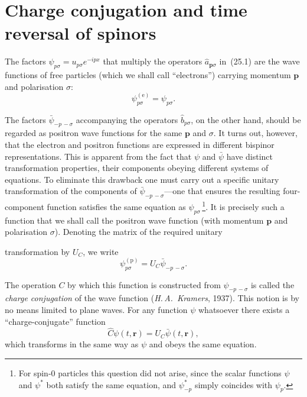 \section{Charge conjugation and time reversal of spinors}

The factors $\psi_{p\sigma} = u_{p\sigma}e^{-ipx}$ that multiply the operators $\widehat a_{\mathbf{p}\sigma}$ in~(25.1) are the wave functions of free particles (which we shall call ``electrons'') carrying momentum $\mathbf{p}$ and polarisation $\sigma$:
\[
\psi^{(\text{e})}_{p\sigma} = \psi_{p\sigma}.
\]

The factors $\bar\psi_{-p\,-\sigma}$ accompanying the operators $\widehat b_{p\sigma}$, on the other hand, should be regarded as positron wave functions for the same $\mathbf{p}$ and $\sigma$. It turns out, however, that the electron and positron functions are expressed in different bispinor representations. This is apparent from the fact that $\psi$ and $\bar\psi$ have distinct transformation properties, their components obeying different systems of equations. To eliminate this drawback one must carry out a specific unitary transformation of the components of $\bar\psi_{-p\,-\sigma}$---one that ensures the resulting four-component function satisfies the same equation as $\psi_{p\sigma}$\,\footnote{For spin-0 particles this question did not arise, since the scalar functions $\psi$ and $\psi^*$ both satisfy the same equation, and $\psi^*_{-p}$ simply coincides with $\psi_p$.}. It is precisely such a function that we shall call the positron wave function (with momentum $\mathbf{p}$ and polarisation $\sigma$). Denoting the matrix of the required unitary

transformation by $U_C$, we write
\begin{equation}
\psi^{(\text{p})}_{p\sigma} = U_C\bar\psi_{-p\,-\sigma}.
\tag{26.1}
\end{equation}

The operation $C$ by which this function is constructed from $\psi_{-p\,-\sigma}$ is called the \emph{charge conjugation} of the wave function (\emph{H.\,A.~Kramers}, 1937). This notion is by no means limited to plane waves. For any function $\psi$ whatsoever there exists a ``charge-conjugate'' function
\begin{equation}
\widehat C\psi(t,\mathbf{r}) = U_C\bar\psi(t,\mathbf{r}),
\tag{26.2}
\end{equation}
which transforms in the same way as $\psi$ and obeys the same equation.

